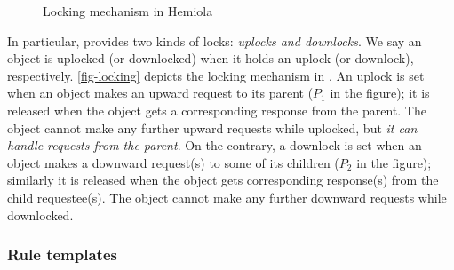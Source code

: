 \begin{figure}[h]
  \centering
  \caption{Locking mechanism in Hemiola}
  \label{fig-locking}
\end{figure}

In particular, \hemiola{} provides two kinds of locks: \emph{uplocks and downlocks}.
We say an object is uplocked (or downlocked) when it holds an uplock (or downlock), respectively.
\autoref{fig-locking} depicts the locking mechanism in \hemiola{}.
An uplock is set when an object makes an upward request to its parent ($P_1$ in the figure); it is released when the object gets a corresponding response from the parent.
The object cannot make any further upward requests while uplocked, but \emph{it can handle requests from the parent}.
On the contrary, a downlock is set when an object makes a downward request(s) to some of its children ($P_2$ in the figure); similarly it is released when the object gets corresponding response(s) from the child requestee(s).
The object cannot make any further downward requests while downlocked.

\subsubsection{Rule templates}

\newcommand{\rtname}[1]{{\small\sf\bf #1}}

\newcommand{\uled}{\ensuremath{\textsf{UL}}}
\newcommand{\dled}{\ensuremath{\textsf{DL}}}
\newcommand{\ulfree}{\ensuremath{\textsf{UL}_{\times}}}
\newcommand{\dlfree}{\ensuremath{\textsf{DL}_{\times}}}

